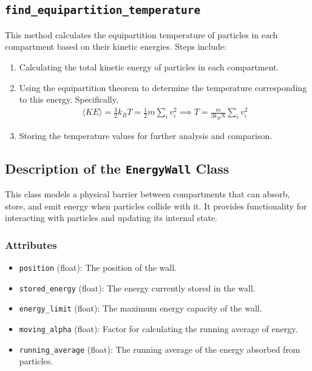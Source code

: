 \documentclass[10pt]{article}
\begin{document}
\subsection*{\texttt{find\_equipartition\_temperature}}
This method calculates the equipartition temperature of particles in each compartment based on their kinetic energies. Steps include:
\begin{enumerate}
    \itemsep-0.2em
    \item Calculating the total kinetic energy of particles in each compartment.
    \item Using the equipartition theorem to determine the temperature corresponding to this energy. Specifically,
    \begin{align}
        \langle KE \rangle = \frac{3}{2} k_B T = \frac{1}{2} m \sum_i v_i^2 \implies T = \frac{m}{3k_B N} \sum_i v_i^2
    \end{align}
    \item Storing the temperature values for further analysis and comparison.
\end{enumerate}


\subsection*{Description of the \texttt{EnergyWall} Class}
This class models a physical barrier between compartments that can absorb, store, and emit energy when particles collide with it. It provides functionality for interacting with particles and updating its internal state.

\subsubsection*{Attributes}
\begin{itemize}
    \itemsep-0.2em
    \item \texttt{position} (float): The position of the wall.
    \item \texttt{stored\_energy} (float): The energy currently stored in the wall.
    \item \texttt{energy\_limit} (float): The maximum energy capacity of the wall.
    \item \texttt{moving\_alpha} (float): Factor for calculating the running average of energy.
    \item \texttt{running\_average} (float): The running average of the energy absorbed from particles.
\end{itemize}
\end{document}
